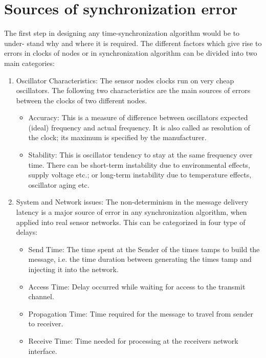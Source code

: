 \documentclass[a4paper,8pt]{report}
\begin{document}
\section{Sources of synchronization error}
The first step in designing any time-synchronization algorithm would be to under-
stand why and where it is required. The different factors which give
rise to errors in clocks of nodes or in synchronization algorithm
can be divided into two main categories:
\begin{enumerate}
\item Oscillator Characteristics: The sensor nodes clocks run on very cheap oscillators.
      The following two characteristics are the main sources of errors between the clocks
      of two different nodes.
      \begin{itemize}
         \item Accuracy: This is a measure of difference between oscillators expected (ideal)
           frequency and actual frequency. It is also called as resolution of the clock; its
           maximum is specified by the manufacturer.
         \item Stability: This is oscillator tendency to stay at the same frequency over
           time. There can be short-term instability due to environmental effects, supply
           voltage etc.; or long-term instability due to temperature effects, oscillator
           aging etc.
      \end{itemize}
\item System and Network issues: The non-determinism in the message delivery latency
      is a major source of error in any synchronization algorithm, when applied into real
      sensor networks. This can be categorized in four type of
      delays:
      \begin{itemize}
         \item Send Time: The time spent at the Sender of the times tamps to build the
          message, i.e. the time duration between generating the times tamp and injecting
            it into the network.
         \item Access Time: Delay occurred while waiting for access to the transmit channel.
         \item Propagation Time: Time required for the message to travel from sender to receiver.
         \item Receive Time: Time needed for processing at the receivers network interface.
      \end{itemize}
\end{enumerate}
\end{document}
